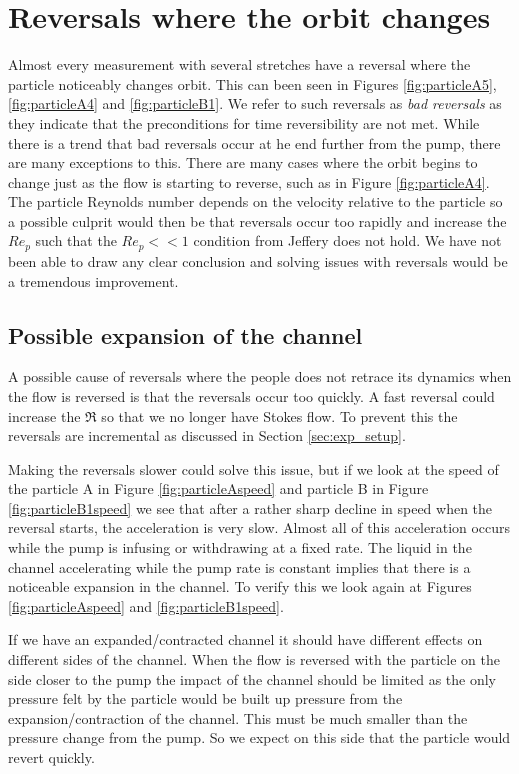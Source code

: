 \section{Reversals where the orbit changes}
Almost every measurement with several stretches have a reversal where the particle noticeably changes orbit. This can been seen in Figures \ref{fig:particleA5}, \ref{fig:particleA4} and \ref{fig:particleB1}. We refer to such reversals as \emph{bad reversals} as they indicate that the preconditions for time reversibility are not met. While there is a trend that bad reversals occur at he end further from the pump, there are many exceptions to this. There are many cases where the orbit begins to change just as the flow is starting to reverse, such as in Figure \ref{fig:particleA4}. The particle Reynolds number depends on the velocity relative to the particle so a possible culprit would then be that reversals occur too rapidly and increase the $Re_p$ such that the $Re_p << 1$ condition from Jeffery \cite{Jeffery} does not hold. We have not been able to draw any clear conclusion and solving issues with reversals would be a tremendous improvement.


\subsection{Possible expansion of the channel}
A possible cause of reversals where the people does not retrace its dynamics when the flow is reversed is that the reversals occur too quickly. A fast reversal could increase the $\Re$ so that we no longer have Stokes flow. To prevent this the reversals are incremental as discussed in Section \ref{sec:exp_setup}. 

Making the reversals slower could solve this issue, but if we look at the speed of the particle A in Figure \ref{fig:particleAspeed} and particle B in Figure \ref{fig:particleB1speed} we see that after a rather 
sharp decline in speed when the reversal starts, the acceleration is very slow. Almost all of this acceleration occurs while the pump is 
infusing or withdrawing at a fixed rate. The liquid in the channel accelerating while the pump rate is constant implies that there 
is a noticeable expansion in the channel. To verify this we look again at Figures
\ref{fig:particleAspeed} and \ref{fig:particleB1speed}.

If we have an expanded/contracted channel it should have different effects on different sides of the channel. When the flow is reversed with the particle on the side closer to the pump the impact of the channel should be limited as the only pressure felt by the particle would be built up pressure from the expansion/contraction of the channel. This must be much smaller than the pressure change from the pump. So we expect on this side that the particle would revert quickly.

